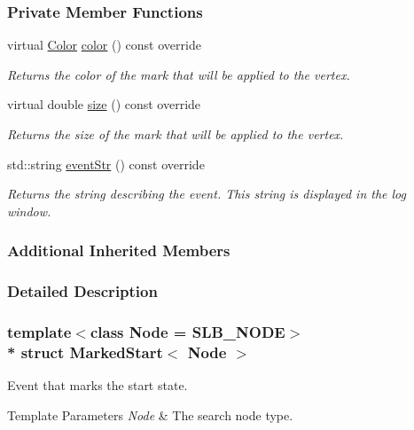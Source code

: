 \subsubsection*{Private Member Functions}
\begin{DoxyCompactItemize}
\item 
virtual \hyperlink{colors_8h_ab87bacfdad76e61b9412d7124be44c1c}{Color} \hyperlink{structMarkedStart_a0bdad45ae32722b5129541235bb3a4f4}{color} () const override
\begin{DoxyCompactList}\small\item\em Returns the color of the mark that will be applied to the vertex. \end{DoxyCompactList}\item 
virtual double \hyperlink{structMarkedStart_a777500cb4f0ac82cf8898a42c9860f04}{size} () const override
\begin{DoxyCompactList}\small\item\em Returns the size of the mark that will be applied to the vertex. \end{DoxyCompactList}\item 
std\+::string \hyperlink{structMarkedStart_aff85f852795fc2ad6ee7a8fe7938b443}{event\+Str} () const override
\begin{DoxyCompactList}\small\item\em Returns the string describing the event. This string is displayed in the log window. \end{DoxyCompactList}\end{DoxyCompactItemize}
\subsubsection*{Additional Inherited Members}


\subsubsection{Detailed Description}
\subsubsection*{template$<$class Node = S\+L\+B\+\_\+\+N\+O\+DE$>$\\*
struct Marked\+Start$<$ Node $>$}

Event that marks the start state. 


\begin{DoxyTemplParams}{Template Parameters}
{\em Node} & The search node type. \\
\hline
\end{DoxyTemplParams}


